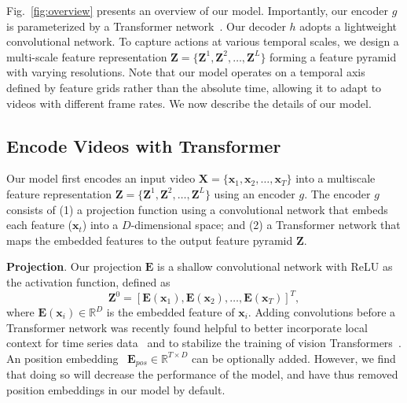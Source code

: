 Fig.\ \ref{fig:overview} presents an overview of our model. Importantly, our encoder $g$ is parameterized by a Transformer network~\cite{transformernips2017}. Our decoder $h$ adopts a lightweight convolutional network. To capture actions at various temporal scales, we design a multi-scale feature representation $\mathbf{Z}=\{\mathbf{Z}^1, \mathbf{Z}^2, \ldots, \mathbf{Z}^L\}$ forming a feature pyramid with varying resolutions. Note that our model operates on a temporal axis defined by feature grids rather than the absolute time, allowing it to adapt to videos with different frame rates. We now describe the details of our model.

\subsection{Encode Videos with Transformer}\label{sec:method:encoder}
Our model first encodes an input video $\mathbf{X}=\{\mathbf{x}_1, \mathbf{x}_2, \ldots, \mathbf{x}_T\}$ into a multiscale feature representation $\mathbf{Z}=\{\mathbf{Z}^1, \mathbf{Z}^2, \ldots, \mathbf{Z}^L\}$ using an encoder $g$. The encoder $g$ consists of (1) a projection function using a convolutional network that embeds each feature ($\mathbf{x}_t$) into a $D$-dimensional space; and (2) a Transformer network that maps the embedded features to the output feature pyramid $\mathbf{Z}$.

\smallskip
\noindent \textbf{Projection}. Our projection $\mathbf{E}$ is a shallow convolutional network with ReLU as the activation function, defined as
\begin{equation}
    \mathbf{Z}^0 = [ \mathbf{E}(\mathbf{x}_1), \mathbf{E}(\mathbf{x}_2), \ldots , \mathbf{E}(\mathbf{x}_T) ]^T,
\end{equation}%
where $\mathbf{E}(\mathbf{x}_i) \in \mathbb{R}^{D}$ is the embedded feature of $\mathbf{x}_i$. Adding convolutions before a Transformer network was recently found helpful to better incorporate local context for time series data~\cite{li2019enhancing} and to stabilize the training of vision Transformers~\cite{xiao2021early}. An position embedding~\cite{transformernips2017} $\mathbf{E}_{pos}  \in \mathbb{R}^{T \times D}$ can be optionally added. However, we find that doing so will decrease the performance of the model, and have thus removed position embeddings in our model by default. 


